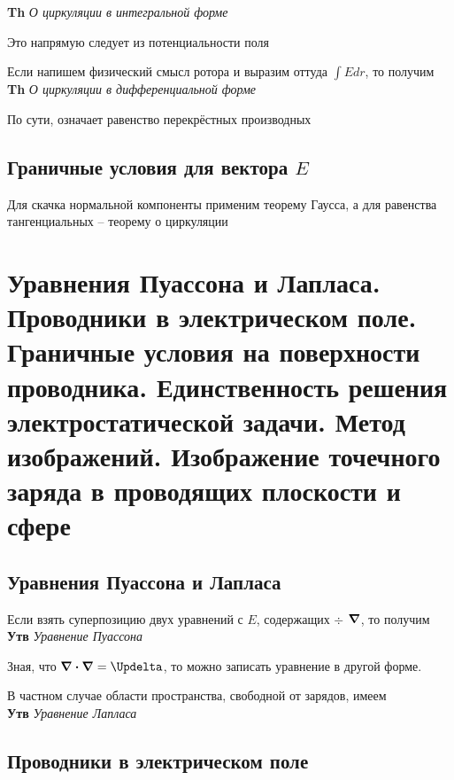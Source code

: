 \documentclass[a4paper, 14pt]{article}
\begin{document}
    \textbf{Th} \textit{О циркуляции в интегральной форме}
    
    Это напрямую следует из потенциальности поля
    
    Если напишем физический смысл ротора и выразим оттуда $\int Edr$, то получим \\
    
    \textbf{Th} \textit{О циркуляции в дифференциальной форме}
    
    По сути, означает равенство перекрёстных производных
    
    \subsection{Граничные условия для вектора $E$}
    
    Для скачка нормальной компоненты применим теорему Гаусса, а для равенства тангенциальных -- теорему о циркуляции
    
    \section{Уравнения Пуассона и Лапласа.
    Проводники в электрическом поле.
    Граничные условия на поверхности проводника.
    Единственность решения электростатической задачи.
    Метод изображений.
    Изображение точечного заряда в проводящих плоскости и сфере}
    
    \subsection{Уравнения Пуассона и Лапласа}
    
    Если взять суперпозицию двух уравнений с $E$, содержащих $\div$ $\grad$, то получим \\
    
    \textbf{Утв} \textit{Уравнение Пуассона}
    
    Зная, что $\div \grad = \Updelta$, то можно записать уравнение в другой форме.
    
    В частном случае области пространства, свободной от зарядов, имеем \\
    
    \textbf{Утв} \textit{Уравнение Лапласа}
    
    \subsection{Проводники в электрическом поле}
    
\end{document}
